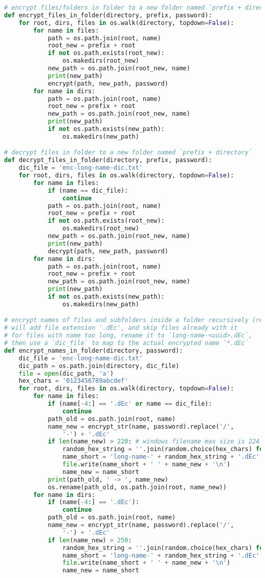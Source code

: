 \begin{lstlisting}[language=python,caption=encrypt.py]
# encrypt files/folders in folder to a new folder named `prefix + directory`
def encrypt_files_in_folder(directory, prefix, password):
	for root, dirs, files in os.walk(directory, topdown=False):
		for name in files:
			path = os.path.join(root, name)
			root_new = prefix + root
			if not os.path.exists(root_new):
				os.makedirs(root_new)
			new_path = os.path.join(root_new, name)
			print(new_path)
			encrypt(path, new_path, password)
		for name in dirs:
			path = os.path.join(root, name)
			root_new = prefix + root
			new_path = os.path.join(root_new, name)
			print(new_path)
			if not os.path.exists(new_path):
				os.makedirs(new_path)

# decrypt files in folder to a new folder named `prefix + directory`
def decrypt_files_in_folder(directory, prefix, password):
	dic_file = 'enc-long-name-dic.txt'
	for root, dirs, files in os.walk(directory, topdown=False):
		for name in files:
			if (name == dic_file):
				continue
			path = os.path.join(root, name)
			root_new = prefix + root
			if not os.path.exists(root_new):
				os.makedirs(root_new)
			new_path = os.path.join(root_new, name)
			print(new_path)
			decrypt(path, new_path, password)
		for name in dirs:
			path = os.path.join(root, name)
			root_new = prefix + root
			new_path = os.path.join(root_new, name)
			print(new_path)
			if not os.path.exists(new_path):
				os.makedirs(new_path)

# encrypt names of files and subfolders inside a folder recursively (rename)
# will add file extension '.dEc', and skip files already with it
# for files with name too long, rename it to `long-name-<uuid>.dEc`,
# then use a `dic_file` to map to the actual encrypted name `*.dEc`
def encrypt_names_in_folder(directory, password):
	dic_file = 'enc-long-name-dic.txt'
	dic_path = os.path.join(directory, dic_file)
	file = open(dic_path, 'a')
	hex_chars = '0123456789abcdef'
	for root, dirs, files in os.walk(directory, topdown=False):
		for name in files:
			if (name[-4:] == '.dEc' or name == dic_file):
				continue
			path_old = os.path.join(root, name)
			name_new = encrypt_str(name, password).replace('/',
				'-') + '.dEc'
			if len(name_new) > 220: # windows filename max size is 224
				random_hex_string = ''.join(random.choice(hex_chars) for _ in range(32))
				name_short = 'long-name-' + random_hex_string + '.dEc'
				file.write(name_short + ' ' + name_new + '\n')
				name_new = name_short
			print(path_old, ' -> ', name_new)
			os.rename(path_old, os.path.join(root, name_new))
		for name in dirs:
			if (name[-4:] == '.dEc'):
				continue
			path_old = os.path.join(root, name)
			name_new = encrypt_str(name, password).replace('/',
				'-') + '.dEc'
			if len(name_new) > 250:
				random_hex_string = ''.join(random.choice(hex_chars) for _ in range(32))
				name_short = 'long-name-' + random_hex_string + '.dEc'
				file.write(name_short + ' ' + name_new + '\n')
				name_new = name_short
				

\end{lstlisting}
